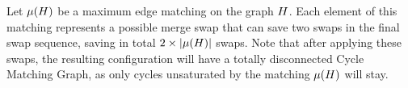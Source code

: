 \documentclass[msc]{ppgccufmg}    %
\begin{document}
Let $\mu(H)$ be a maximum edge matching on the graph 
$H$.
Each element of this matching represents a possible merge swap that can save two 
swaps in the final swap sequence, saving in total $2\times|\mu(H)|$ swaps.
Note that after applying these swaps, the resulting configuration will have a
totally disconnected Cycle Matching Graph, as only cycles unsaturated by the 
matching $\mu(H)$ will stay.





\end{document}

